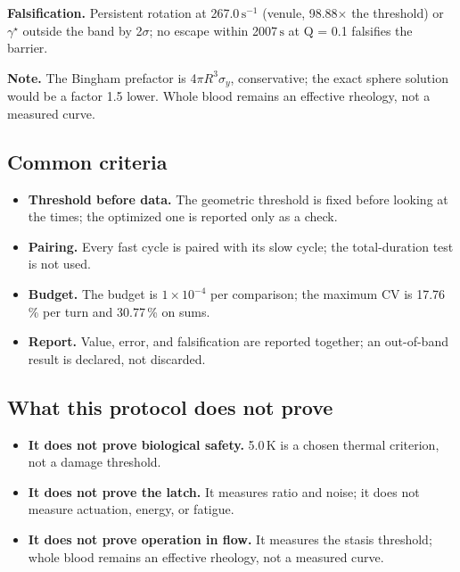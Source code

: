 \documentclass[9pt,a4paper]{article}
\begin{document}
\textbf{Falsification.} Persistent rotation at 267.0\,$\mathrm{s}^{-1}$ (venule, 98.88$\times$ the threshold) or $\gamma^\star$ outside the band by 2$\sigma$; no escape within 2007\,$\mathrm{s}$ at Q = 0.1 falsifies the barrier.

\textbf{Note.} The Bingham prefactor is 4$\pi R^3\sigma_y$, conservative; the exact sphere solution would be a factor 1.5 lower. Whole blood remains an effective rheology, not a measured curve.

\subsection*{Common criteria}
\begin{itemize}
\item \textbf{Threshold before data.} The geometric threshold is fixed before looking at the times; the optimized one is reported only as a check.
\item \textbf{Pairing.} Every fast cycle is paired with its slow cycle; the total-duration test is not used.
\item \textbf{Budget.} The budget is $1\times 10^{-4}$ per comparison; the maximum CV is 17.76\,\% per turn and 30.77\,\% on sums.
\item \textbf{Report.} Value, error, and falsification are reported together; an out-of-band result is declared, not discarded.
\end{itemize}
\subsection*{What this protocol does not prove}
\begin{itemize}
\item \textbf{It does not prove biological safety.} 5.0\,$\mathrm{K}$ is a chosen thermal criterion, not a damage threshold.
\item \textbf{It does not prove the latch.} It measures ratio and noise; it does not measure actuation, energy, or fatigue.
\item \textbf{It does not prove operation in flow.} It measures the stasis threshold; whole blood remains an effective rheology, not a measured curve.
\end{itemize}
\end{document}
